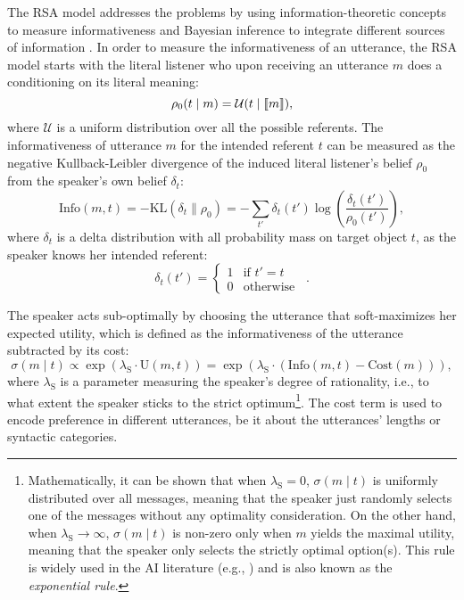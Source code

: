 The RSA model addresses the problems by using information-theoretic
concepts to measure informativeness and Bayesian inference to
integrate different sources of information
\cite{Frank2009,Frank,Bergen2012,GoodmanStuhlmuller2013:Knowledge-and-I}. In
order to measure the informativeness of an utterance, the RSA model
starts with the literal listener who upon receiving an utterance $m$
does a conditioning on its literal meaning:
\begin{equation}\label{Bayesian_literal}
\rho_0(t \mid m) = \mathcal{U}(t\mid \llbracket m \rrbracket) ,
\end{equation}
where $\mathcal{U}$ is a uniform distribution over all the possible
referents. The informativeness of utterance $m$ for the intended
referent $t$ can be measured as the negative Kullback-Leibler
divergence of the induced literal listener's belief $\rho_0$ from the
speaker's own belief $\delta_t$:
\begin{equation} \label{Bayesian_sender_informativeness}
\mbox{Info}(m,t)=-\mbox{KL}(\delta_t \| \rho_0)=-\sum_{t'}\delta_t(t')\log\left(\frac{\delta_t(t')}{\rho_0(t')}\right),
\end{equation}
where $\delta_t$ is a delta distribution with all probability mass on
target object $t$, as the speaker knows her intended referent:
\begin{equation} \label{Bayesian_sender_delta}
\delta_t(t')=\left\{ \begin{array}{ll}
1 & \mbox{if } t' = t \\
0 & \mbox{otherwise}
\end{array}\right. \enspace .
\end{equation}

The speaker acts sub-optimally by choosing the utterance that soft-maximizes her expected utility, which is defined as the informativeness of the utterance subtracted by its cost:
\begin{equation} \label{Bayesian_sender_softmax}
\sigma(m \mid t) \propto \exp(\lambda_\mathrm{S}\cdot \mbox{U}(m,t))=\exp(\lambda_\mathrm{S} \cdot (\mbox{Info}(m,t)-\mbox{Cost}(m))),
\end{equation}
where $\lambda_\mathrm{S}$ is a parameter measuring the speaker's
degree of rationality, i.e., to what extent the speaker sticks to the
strict optimum\footnote{Mathematically, it can be shown that when $\lambda_\mathrm{S}=0$, $\sigma(m \mid t)$ is uniformly distributed over all messages, meaning that the speaker just randomly selects one of the messages without any optimality consideration. 
On the other hand, when $\lambda_\mathrm{S}\rightarrow \infty$, 
$\sigma(m \mid t)$ is non-zero only when $m$ yields the maximal utility, 
meaning that the speaker only selects the strictly optimal option(s).
This rule is widely used in the AI literature (e.g., \cite{Sutton1998RL}) and 
is also known as the \emph{exponential rule}.}.
The cost term is used to encode preference in
different utterances, be it about the utterances' lengths or syntactic
categories.

